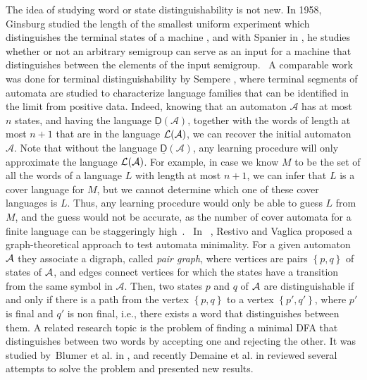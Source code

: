 \documentclass{article}
\newcommand{\dfa}{DFA\xspace}
\newcommand{\distmin}[1]{\underline{\mathsf{D}}(#1)}
\newcommand{\Set}[1]{\left\{ #1 \right\}}
\newcommand{\lang}[1]{{\cal L}(#1)}
\begin{document}
The idea of studying word or state distinguishability is not new. 
In 1958, Ginsburg studied the length of the smallest uniform experiment 
which distinguishes the terminal states of a machine 
\cite{ginsburg58:_lengt_of_small_unifor_exper},
and with Spanier in \cite{Ginsburg1960:InputSemigroup}, he studies whether or not 
an arbitrary semigroup can serve as an input for a 
machine that distinguishes between the elements of the input semigroup.
\ A comparable work was done for terminal
distinguishability by Sempere \cite{JoseSempere}, where terminal
 segments of automata are studied to characterize language 
 families that can be identified in the limit from positive data.  
Indeed, knowing that an automaton $\mathcal{A}$ has at most $n$
states, and having the language $\distmin{\mathcal{A}}$, together with the
words of length at most $n+1$ that are in the language $\lang{\mathcal{A}}$, we
can recover the initial automaton $\mathcal{A}$.  
Note that without the language $\distmin{\mathcal{A}}$, any learning
procedure will only approximate the language $\lang{\mathcal{A}}$.  
For example, in case we know $M$ to be the set of all the
words of a language $L$ with length at most $n+1$, we can infer that
$L$ is a cover language for $M$, but we cannot determine which one of
these cover languages is $L$. 
Thus, any learning procedure would only be able to guess $L$ from $M$,
and the guess would not be accurate, as the number of cover automata
for a finite language can be staggeringly
high~\cite{campeanu13:_cover_languag_and_implem,CezarAndreiCount}. 
\ In ~\cite{restivo12:_graph_theor_approac_to_autom_minim}, 
Restivo and
Vaglica proposed a graph-theoretical approach to test automata
minimality. For  a given automaton ${\cal A}$ they associate 
a digraph, called \emph{pair graph}, where vertices are pairs
$\Set{p,q}$ of states of ${\cal A}$, and  edges connect vertices for which
the states have a transition from the same symbol in $\mathcal{A}$. Then, two states
$p$ and $q$ of ${\cal A}$ are distinguishable if and only if there is a path
from the vertex $\Set{p,q}$ to a vertex $\Set{p', q'}$, where $p'$ is
final and $q'$  is non final, i.e., there exists a word that distinguishes
between them. 
A related research topic is the problem of finding a minimal \dfa that
 distinguishes between two words by accepting one and rejecting the other.
It was studied by~Blumer et
al. in \cite{blumer85:_small_autom_recog_subwor_of_text}, and recently 
Demaine et al. in \cite{demaine11:_remar_separ_words} 
reviewed several attempts to solve the problem and presented new results. 
\end{document}

